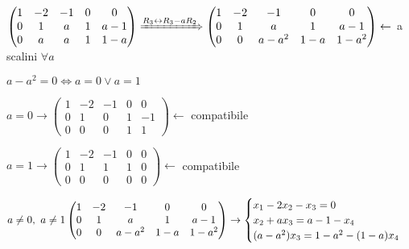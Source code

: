 \documentclass{article}
\begin{document}
\begin{enumerate}
\begin{enumerate}
		            $\begin{pmatrix}
				            1 & -2 & -1 & 0 & 0   \\
				            0 & 1  & a  & 1 & a-1 \\
				            0 & a  & a  & 1 & 1-a
			            \end{pmatrix}\xRightarrow{R_3\leftrightarrow R_3-aR_2}
			            \begin{pmatrix}
				            1 & -2 & -1    & 0   & 0     \\
				            0 & 1  & a     & 1   & a-1   \\
				            0 & 0  & a-a^2 & 1-a & 1-a^2
			            \end{pmatrix}\leftarrow$ a scalini $\forall a$

		            $a-a^2=0\Leftrightarrow a=0\vee a=1$

		            $a=0\rightarrow
			            \begin{pmatrix}
				            1 & -2 & -1 & 0 & 0  \\
				            0 & 1  & 0  & 1 & -1 \\
				            0 & 0  & 0  & 1 & 1
			            \end{pmatrix}\leftarrow$ compatibile

		            $a=1\rightarrow
			            \begin{pmatrix}
				            1 & -2 & -1 & 0 & 0 \\
				            0 & 1  & 1  & 1 & 0 \\
				            0 & 0  & 0  & 0 & 0
			            \end{pmatrix}\leftarrow$ compatibile

		            $a\not=0,\ a\not=1\\
			            \begin{pmatrix}
				            1 & -2 & -1    & 0   & 0     \\
				            0 & 1  & a     & 1   & a-1   \\
				            0 & 0  & a-a^2 & 1-a & 1-a^2
			            \end{pmatrix}\rightarrow
			            \begin{cases}
				            x_1-2x_2-x_3=0   \\
				            x_2+ax_3=a-1-x_4 \\
				            (a-a^2)x_3=1-a^2-(1-a)x_4
			            \end{cases}$
	      \end{enumerate}
\end{enumerate}
\end{document}
